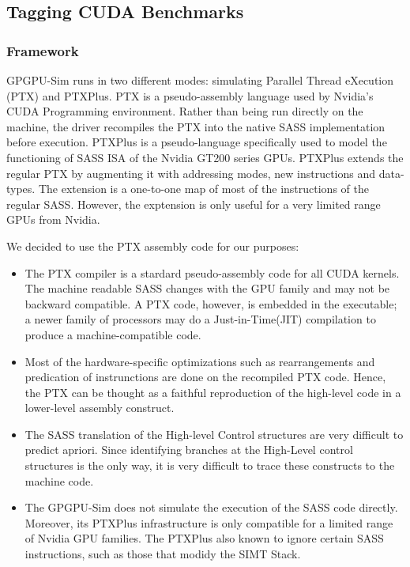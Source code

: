 %
%
\label{sec:our-approach}
\subsection{Tagging CUDA Benchmarks}
	
	\subsubsection*{Framework}	%
	GPGPU-Sim runs in two different modes: simulating Parallel Thread eXecution (PTX) and PTXPlus. PTX is a pseudo-assembly
language used by Nvidia's CUDA Programming environment. Rather than being run directly on the machine, the driver recompiles the
PTX into the native SASS implementation before execution. 
PTXPlus is a pseudo-language specifically used to model the functioning of SASS ISA of the Nvidia GT200 series GPUs. PTXPlus extends
the regular PTX by augmenting it with addressing modes, new instructions and data-types. The extension is a one-to-one map of most of
 the instructions of the regular SASS. However, the exptension is only useful for a very limited range GPUs from Nvidia. 
 
	We decided to use the PTX assembly code for our purposes:
	\begin{itemize}
	\item The PTX compiler is a stardard pseudo-assembly code for all CUDA kernels. The machine readable SASS changes with
	the GPU family and may not be backward compatible. A PTX code, however, is embedded in the executable; a newer
	family of processors may do a Just-in-Time(JIT) compilation to produce a machine-compatible code. 
	\item Most of the hardware-specific optimizations such as rearrangements and predication of instrunctions are done on the 
	recompiled PTX code. Hence, the PTX can be thought as a faithful reproduction of the high-level code in a lower-level
	assembly construct.
	\item The SASS translation of the High-level Control structures are very difficult to predict apriori. Since identifying
	branches at the High-Level control structures is the only way, it is very difficult to trace these constructs to the
	 machine code.
	\item The GPGPU-Sim does not simulate the execution of the SASS code directly. Moreover, its PTXPlus infrastructure is only
	compatible for a limited range of Nvidia GPU families. The PTXPlus also known to ignore certain SASS instructions, such as
	those that modidy the SIMT Stack. 
	\end{itemize}
		
